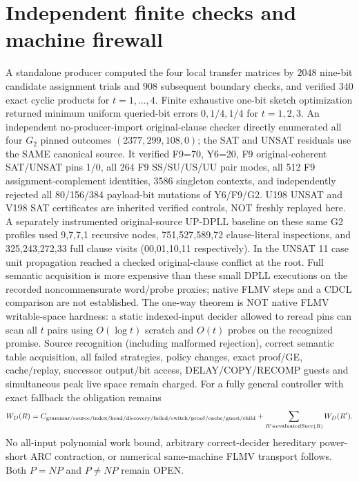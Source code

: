 \documentclass[11pt]{article}
\begin{document}
\section{Independent finite checks and machine firewall}
A standalone producer computed the four local transfer matrices by $2048$ nine-bit candidate assignment trials and $908$ subsequent boundary checks, and verified $340$ exact cyclic products for $t=1,\ldots,4$. Finite exhaustive one-bit sketch optimization returned minimum uniform queried-bit errors $0,1/4,1/4$ for $t=1,2,3$. An independent no-producer-import original-clause checker directly enumerated all four $G_2$ pinned outcomes $(2377,299,108,0)$; the SAT and UNSAT residuals use the SAME canonical source. It verified F9=70, Y6=20, F9 original-coherent SAT/UNSAT pins 1/0, all 264 F9 SS/SU/US/UU pair modes, all 512 F9 assignment-complement identities, 3586 singleton contexts, and independently rejected all 80/156/384 payload-bit mutations of Y6/F9/G2. U198 UNSAT and V198 SAT certificates are inherited verified controls, NOT freshly replayed here. A separately instrumented original-source UP-DPLL baseline on these same G2 profiles used 9,7,7,1 recursive nodes, 751,527,589,72 clause-literal inspections, and 325,243,272,33 full clause visits (00,01,10,11 respectively). In the UNSAT 11 case unit propagation reached a checked original-clause conflict at the root. Full semantic acquisition is more expensive than these small DPLL executions on the recorded noncommensurate word/probe proxies; native FLMV steps and a CDCL comparison are not established.
The one-way theorem is NOT native FLMV writable-space hardness: a static indexed-input decider allowed to reread pins can scan all $t$ pairs using $O(\log t)$ scratch and $O(t)$ probes on the recognized promise. Source recognition (including malformed rejection), correct semantic table acquisition, all failed strategies, policy changes, exact proof/GE, cache/replay, successor output/bit access, DELAY/COPY/RECOMP guests and simultaneous peak live space remain charged.
For a fully general controller with exact fallback the obligation remains
\[
W_D(R)=C_{\rm grammar/source/index/head/discovery/failed/switch/proof/cache/guest/child}
+\sum_{R'\in\mathrm{evaluatedSucc}(R)}W_D(R').
\]
No all-input polynomial work bound, arbitrary correct-decider hereditary power-short ARC contraction, or numerical same-machine FLMV transport follows. Both $P=NP$ and $P\ne NP$ remain OPEN.
\end{document}
